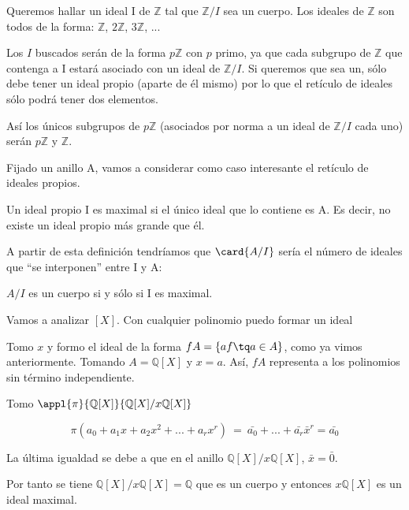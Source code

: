 \documentclass[nochap]{apuntes}
\begin{document}
\begin{example}
 Queremos hallar un ideal I de $\mathbb{Z}$ tal que $\mathbb{Z}/I$  sea un cuerpo.  Los ideales de $\mathbb{Z}$ son todos de la forma: $\mathbb{Z}$, $2\mathbb{Z}$, $3\mathbb{Z}$, ...

 Los $I$ buscados serán de la forma $p\mathbb{Z}$  con $p$ primo, ya que cada subgrupo de $\mathbb{Z}$ que contenga a I estará asociado con un ideal de $\mathbb{Z}/I$. Si queremos que sea un, sólo debe tener un ideal propio (aparte de él mismo) por lo que el retículo de ideales sólo podrá tener dos elementos.

 Así los únicos subgrupos de $p\mathbb{Z}$  (asociados por norma a un ideal de $\mathbb{Z}/I$  cada uno) serán $p\mathbb{Z}$  y $\mathbb{Z}$.
\end{example}

Fijado un anillo A, vamos a considerar como caso interesante el retículo de ideales propios.
\begin{defn}
 Un ideal propio I es maximal si el único ideal que lo contiene es A. Es decir, no existe un ideal propio más grande que él.\\
\end{defn}

A partir de esta definición tendríamos que  $\card{A/I}$ sería el número de ideales que ``se interponen''  entre I y A:

\begin{lemma}
$A/I$ es un cuerpo si y sólo si I es maximal.
\end{lemma}

\begin{example}
 Vamos a analizar $[X]$. Con cualquier polinomio puedo formar un ideal

 Tomo $x$ y formo el ideal de la forma $fA=\{af \tq a\in A\}$, como ya vimos anteriormente. Tomando $A=\mathbb{Q}[X]$ y $x=a$. Así, $fA$ representa a los polinomios sin término independiente.

 Tomo $\appl{\pi}{\mathbb{Q}[X]}{\mathbb{Q}[X]/x\mathbb{Q}[X]}$

 \[\pi(a_0+a_1x+a_2x^{2}+...+a_rx^{r}) \ = \ \bar{a_0}+...+\bar{a_r}\bar{x}^{r} = \bar{a_0}\]

 La última igualdad se debe a que en el anillo $\mathbb{Q}[X]/x\mathbb{Q}[X]$, $\bar{x}=\bar{0}$.

 Por tanto se tiene $\mathbb{Q}[X]/x\mathbb{Q}[X]=\mathbb{Q}$  que es un cuerpo y entonces $x\mathbb{Q}[X]$  es un ideal maximal.
\end{example}
\end{document}
